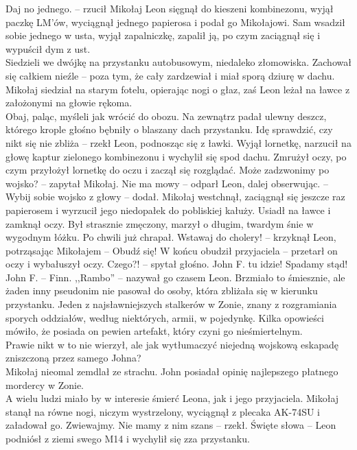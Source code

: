 \documentclass[../MAIN.tex]{subfiles}
\begin{document}
%
\sx Daj no jednego. -- rzucił Mikołaj
\qd
Leon sięgnął do kieszeni kombinezonu, wyjął paczkę LM’ów, wyciągnął jednego papierosa i podał go Mikołajowi. Sam wsadził sobie jednego w usta, wyjął zapalniczkę, zapalił ją, po czym zaciągnął się i wypuścił dym z ust. \\
Siedzieli we dwójkę na przystanku autobusowym, niedaleko złomowiska. Zachował się całkiem nieźle -- poza tym, że cały zardzewiał i miał sporą dziurę w dachu. Mikołaj siedział na starym fotelu, opierając nogi o głaz, zaś Leon leżał na ławce z założonymi na głowie rękoma.\\
Obaj, paląc, myśleli jak wrócić do obozu. Na zewnątrz padał ulewny deszcz, którego krople głośno bębniły o blaszany dach przystanku.
\sx Idę sprawdzić, czy nikt się nie zbliża -- rzekł Leon, podnosząc się z ławki.
\qd
Wyjął lornetkę, narzucił na głowę kaptur zielonego kombinezonu i wychylił się spod dachu. Zmrużył oczy, po czym przyłożył lornetkę do oczu i zaczął się rozglądać.
%
\sx Może zadzwonimy po wojsko? -- zapytał Mikołaj.
\xx Nie ma mowy -- odparł Leon, dalej obserwując. -- Wybij sobie wojsko z głowy -- dodał.
\qd
Mikołaj westchnął, zaciągnął się jeszcze raz papierosem i wyrzucił jego niedopałek do pobliskiej kałuży. Usiadł na ławce i zamknął oczy. Był strasznie zmęczony, marzył o długim, twardym śnie w wygodnym łóżku. Po chwili już chrapał.
\sx Wstawaj do cholery! -- krzyknął Leon, potrząsając Mikołajem -- Obudź się!
\qd
W końcu obudził przyjaciela -- przetarł on oczy i wybałuszył oczy.
%
\sx Czego?! -- spytał głośno.
\xx John F. tu idzie! Spadamy stąd!
\qd
John F. -- Finn. ,,Rambo'' -- nazywał go czasem Leon. Brzmiało to śmiesznie, ale żaden inny pseudonim nie pasował do osoby, która zbliżała się w kierunku przystanku. Jeden z najsławniejszych stalkerów w Zonie, znany z rozgramiania sporych oddziałów, według niektórych, armii, w pojedynkę. Kilka opowieści mówiło, że posiada on pewien artefakt, który czyni go nieśmiertelnym.\\
Prawie nikt w to nie wierzył, ale jak wytłumaczyć niejedną wojskową eskapadę zniszczoną przez samego Johna? \\
Mikołaj nieomal zemdlał ze strachu. John posiadał opinię najlepszego płatnego mordercy w Zonie.\\
A wielu ludzi miało by w interesie śmierć Leona, jak i jego przyjaciela. Mikołaj stanął na równe nogi, niczym wystrzelony, wyciągnął z plecaka AK-74SU i załadował go.
%
\sx Zwiewajmy. Nie mamy z nim szans -- rzekł.
\xx Święte słowa -- Leon podniósł z ziemi swego M14 i wychylił się zza przystanku.
\end{document}
